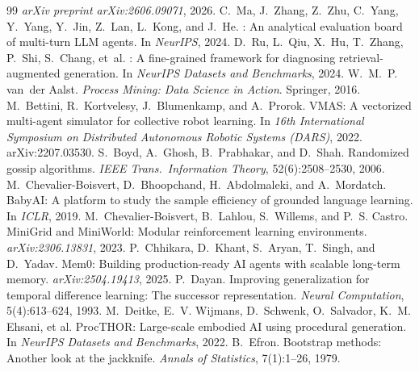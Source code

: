 \documentclass{article}
\begin{document}
\begin{thebibliography}{99}
\newblock \emph{arXiv preprint arXiv:2606.09071}, 2026.
C.~Ma, J.~Zhang, Z.~Zhu, C.~Yang, Y.~Yang, Y.~Jin, Z.~Lan, L.~Kong, and J.~He.
: An analytical evaluation board of multi-turn {LLM} agents.
\newblock In \emph{NeurIPS}, 2024.
D.~Ru, L.~Qiu, X.~Hu, T.~Zhang, P.~Shi, S.~Chang, et~al.
: A fine-grained framework for diagnosing retrieval-augmented generation.
\newblock In \emph{NeurIPS Datasets and Benchmarks}, 2024.
W.~M.~P. van~der Aalst.
\newblock \emph{Process Mining: Data Science in Action}.
\newblock Springer, 2016.
M.~Bettini, R.~Kortvelesy, J.~Blumenkamp, and A.~Prorok.
\newblock VMAS: A vectorized multi-agent simulator for collective robot learning.
\newblock In \emph{16th International Symposium on Distributed Autonomous Robotic Systems (DARS)}, 2022.
\newblock arXiv:2207.03530.
S.~Boyd, A.~Ghosh, B.~Prabhakar, and D.~Shah.
\newblock Randomized gossip algorithms.
\newblock \emph{IEEE Trans.\ Information Theory}, 52(6):2508--2530, 2006.
M.~Chevalier-Boisvert, D.~Bhoopchand, H.~Abdolmaleki, and A.~Mordatch.
\newblock BabyAI: A platform to study the sample efficiency of grounded language learning.
\newblock In \emph{ICLR}, 2019.
M.~Chevalier-Boisvert, B.~Lahlou, S.~Willems, and P.~S. Castro.
\newblock MiniGrid and MiniWorld: Modular reinforcement learning environments.
\newblock \emph{arXiv:2306.13831}, 2023.
P.~Chhikara, D.~Khant, S.~Aryan, T.~Singh, and D.~Yadav.
\newblock Mem0: Building production-ready AI agents with scalable long-term memory.
\newblock \emph{arXiv:2504.19413}, 2025.
P.~Dayan.
\newblock Improving generalization for temporal difference learning: The successor representation.
\newblock \emph{Neural Computation}, 5(4):613--624, 1993.
M.~Deitke, E.~V. Wijmans, D.~Schwenk, O.~Salvador, K.~M. Ehsani, et al.
\newblock ProcTHOR: Large-scale embodied AI using procedural generation.
\newblock In \emph{NeurIPS Datasets and Benchmarks}, 2022.
B.~Efron.
\newblock Bootstrap methods: Another look at the jackknife.
\newblock \emph{Annals of Statistics}, 7(1):1--26, 1979.

\end{thebibliography}
\end{document}
